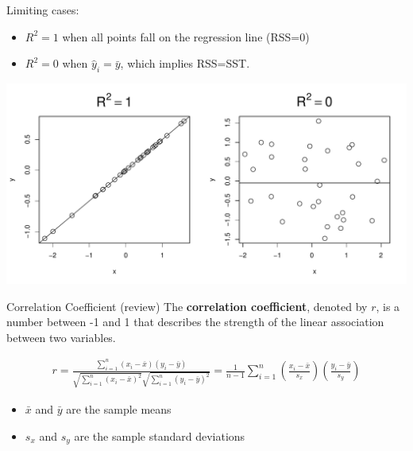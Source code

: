 \documentclass[10pt]{beamer}
\begin{document}
\begin{frame}
Limiting cases:
\begin{itemize}
\item $R^2 = 1$ when all points fall on the regression line (RSS=0)
\item $R^2 = 0$ when $\hat{y}_i = \bar{y}$, which implies RSS=SST.
\end{itemize}
\centering
\includegraphics[scale=0.4]{figure/R2.pdf}
\end{frame}

\begin{frame}{Correlation Coefficient (review)}
The \textbf{correlation coefficient}, denoted by $r$, is a number between -1 and 1 that describes the strength of the linear association between two variables.

\begin{align*}
r = \frac{\sum_{i=1}^n (x_i - \bar{x}) (y_i - \bar{y})}{\sqrt{\sum_{i=1}^n (x_i - \bar{x})^2} \sqrt{\sum_{i=1}^n (y_i - \bar{y})^2}} = \frac{1}{n-1} \sum_{i=1}^n \left(\frac{x_i - \bar{x}}{s_x} \right) \left( \frac{y_i - \bar{y}}{s_y} \right)
\end{align*}
\begin{itemize}
\item $\bar{x}$ and $\bar{y}$ are the sample means
\item $s_x$ and $s_y$ are the sample standard deviations
\end{itemize}
\end{frame}
\end{document}
